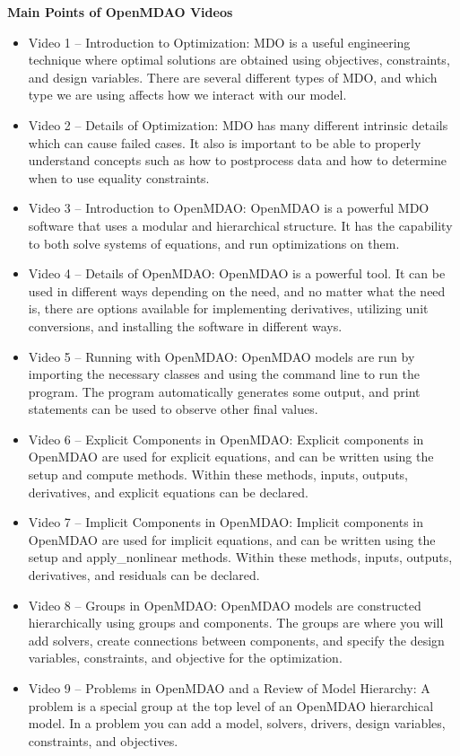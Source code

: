\documentclass[12pt, letterpaper]{article}
\begin{document}
\centerline{\textbf{Main Points of OpenMDAO Videos}}

\begin{itemize}
	\item Video 1 – Introduction to Optimization: MDO is a useful engineering technique where optimal solutions are obtained using objectives, constraints, and design variables. There are several different types of MDO, and which type we are using affects how we interact with our model.
	\item Video 2 – Details of Optimization: MDO has many different intrinsic details which can cause failed cases. It also is important to be able to properly understand concepts such as how to postprocess data and how to determine when to use equality constraints.
	\item Video 3 – Introduction to OpenMDAO: OpenMDAO is a powerful MDO software that uses a modular and hierarchical structure. It has the capability to both solve systems of equations, and run optimizations on them.
	\item Video 4 – Details of OpenMDAO: OpenMDAO is a powerful tool. It can be used in different ways depending on the need, and no matter what the need is, there are options available for implementing derivatives, utilizing unit conversions, and installing the software in different ways.
	\item Video 5 – Running with OpenMDAO: OpenMDAO models are run by importing the necessary classes and using the command line to run the program. The program automatically generates some output, and print statements can be used to observe other final values.
	\item Video 6 – Explicit Components in OpenMDAO: Explicit components in OpenMDAO are used for explicit equations, and can be written using the setup and compute methods. Within these methods, inputs, outputs, derivatives, and explicit equations can be declared.
	\item Video 7 – Implicit Components in OpenMDAO: Implicit components in OpenMDAO are used for implicit equations, and can be written using the setup and apply\_nonlinear methods. Within these methods, inputs, outputs, derivatives, and residuals can be declared.
	\item Video 8 – Groups in OpenMDAO: OpenMDAO models are constructed hierarchically using groups and components. The groups are where you will add solvers, create connections between components, and specify the design variables, constraints, and objective for the optimization.
	\item Video 9 – Problems in OpenMDAO and a Review of Model Hierarchy: A problem is a special group at the top level of an OpenMDAO hierarchical model. In a problem you can add a model, solvers, drivers, design variables, constraints, and objectives.

\end{itemize}
\end{document}
